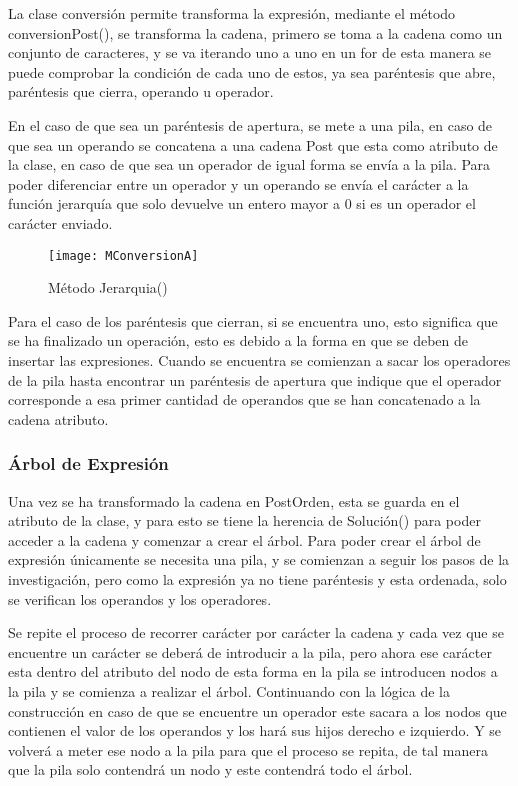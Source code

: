 \documentclass[12pt,a4paper]{article}
\begin{document}
	La clase conversión permite transforma la expresión, mediante el método conversionPost(), se transforma la cadena, primero se toma a la cadena como un conjunto de caracteres, y se va iterando uno a uno en un for de esta manera se puede comprobar la condición de cada uno de estos, ya sea paréntesis que abre, paréntesis que cierra, operando u operador.

En el caso de que sea un paréntesis de apertura, se mete a una pila, en caso de que sea un operando se concatena a una cadena Post que esta como atributo de la clase, en caso de que sea un operador de igual forma se envía a la pila. Para poder diferenciar entre un operador y un operando se envía el carácter a la función jerarquía que solo devuelve un entero mayor a 0 si es un operador el carácter enviado.

		\begin{figure}[h]
			\centering
			\texttt{[image: MConversionA]}
			\caption{Método Jerarquia()}
		\end{figure}
		
	Para el caso de los paréntesis que cierran, si se encuentra uno, esto significa que se ha finalizado un operación, esto es debido a la forma en que se deben de insertar las expresiones. Cuando se encuentra se comienzan a sacar los operadores de la pila hasta encontrar un  paréntesis de apertura que indique que el operador corresponde a esa primer cantidad de operandos que se han concatenado a la cadena atributo.
		
			\subsubsection{Árbol de Expresión}
	Una vez se ha transformado la cadena en PostOrden, esta se guarda en el atributo de la clase, y para esto se tiene la herencia de Solución() para poder acceder a la cadena y comenzar a crear el árbol. Para poder crear el árbol de expresión únicamente se necesita una pila, y se comienzan a seguir los pasos de la investigación, pero como la expresión ya no tiene paréntesis y esta ordenada, solo se verifican los operandos y  los operadores.
	
	Se repite el proceso de recorrer carácter por carácter la cadena y cada vez que se encuentre un carácter se deberá de introducir a la pila, pero ahora ese carácter esta dentro del atributo del nodo de esta forma en la pila se introducen nodos a la pila y se comienza a realizar el árbol. Continuando con la lógica de la construcción en caso de que se encuentre un operador este sacara a los nodos que contienen el valor de los operandos y los hará sus hijos derecho e izquierdo. Y se volverá a meter ese nodo a la pila para que el proceso se repita, de tal manera que la pila solo contendrá un nodo y este contendrá todo el árbol.
	
\end{document}
